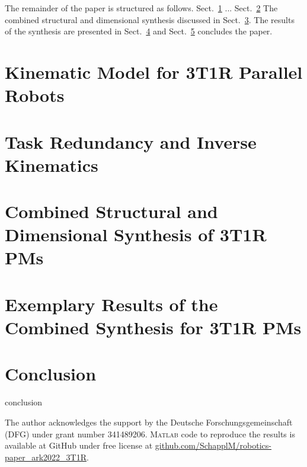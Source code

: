 \documentclass[
	graybox,
	vecphys] %
	{svmult}
\begin{document}
The remainder of the paper is structured as follows. Sect.~\ref{sec:model} ...
Sect.~\ref{sec:taskred}
The combined structural and dimensional synthesis discussed in Sect.~\ref{sec:synthesis}.
The results of the synthesis are presented in Sect.~\ref{sec:results} and Sect.~\ref{sec:conclusion} concludes the paper.


\section{Kinematic Model for 3T1R Parallel Robots}
\label{sec:model}


\section{Task Redundancy and Inverse Kinematics}
\label{sec:taskred}



\section{Combined Structural and Dimensional Synthesis of 3T1R PMs}
\label{sec:synthesis}


\section{Exemplary Results of the Combined Synthesis for 3T1R PMs}
\label{sec:results}



\section{Conclusion}
\label{sec:conclusion}

conclusion


\begin{acknowledgement}
The author acknowledges the support by the Deutsche Forschungsgemeinschaft (DFG) under grant number 341489206. \textsc{Matlab} code to reproduce the results
is available at GitHub under free license at \url{github.com/SchapplM/robotics-paper_ark2022_3T1R}.
%
\end{acknowledgement}



\end{document}
